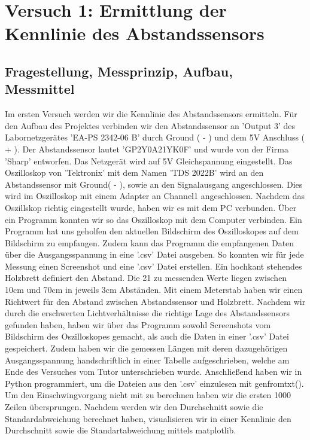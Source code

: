 \documentclass[12pt, oneside, a4paper, \docLanguage]{report}
\begin{document}
%
%
\chapter{Versuch 1: Ermittlung der Kennlinie des Abstandssensors}
\label{chap:VERSUCH_1}

\section{Fragestellung, Messprinzip, Aufbau, Messmittel}
\label{chap:VERSUCH_1_FRAGESTELLUNG}
Im ersten Versuch werden wir die Kennlinie des Abstandssensors ermitteln.  Für den Aufbau des Projektes verbinden wir den Abstandssensor an 'Output 3' des Labornetzgerätes 'EA-PS 2342-06 B' durch Ground ( - ) und dem 5V Anschluss ( + ).
Der Abstandssensor lautet 'GP2Y0A21YK0F' und wurde von der Firma 'Sharp' entworfen. Das Netzgerät wird auf 5V Gleichspannung eingestellt. Das Oszilloskop von 'Tektronix' mit dem Namen 'TDS 2022B' wird an den Abstandssensor mit Ground( - ), sowie an den Signalausgang angeschlossen.
Dies wird im Oszilloskop mit einem Adapter an Channel1 angeschlossen. Nachdem das Oszillskop richtig eingestellt wurde, haben wir es mit dem PC verbunden.
Über ein Programm konnten wir so das Oszilloskop mit dem Computer verbinden. Ein Programm hat uns geholfen den aktuellen Bildschirm des Oszilloskopes auf dem Bildschirm zu empfangen.
Zudem kann das Programm die empfangenen Daten über die Ausgangsspannung in eine '.csv' Datei ausgeben.
So konnten wir für jede Messung einen Screenshot und eine '.csv' Datei erstellen. 
Ein hochkant stehendes Holzbrett definiert den Abstand. Die 21 zu messenden Werte liegen zwischen 10cm und 70cm in jeweils  3cm Abständen. Mit einem Meterstab haben wir einen Richtwert für den Abstand zwischen Abstandssensor und Holzbrett. 
Nachdem wir durch die erschwerten Lichtverhältnisse die richtige Lage des Abstandssensors gefunden haben, haben wir über das Programm sowohl Screenshots vom Bildschirm des Oszilloskopes gemacht, als auch die Daten in einer '.csv' Datei gespeichert.
Zudem haben wir die gemessen Längen mit deren dazugehörigen Ausgangsspannung handschriftlich in einer Tabelle aufgeschrieben, welche am Ende des Versuches vom Tutor unterschrieben wurde.
Anschließend haben wir in Python programmiert, um die Dateien aus den '.csv' einzulesen mit genfromtxt(). Um den Einschwingvorgang nicht mit zu berechnen haben wir die ersten 1000 Zeilen übersprungen. 
Nachdem werden wir den Durchschnitt sowie die Standardabweichung berechnet haben, visualisieren wir in einer Kennlinie den Durchschnitt sowie die Standartabweichung mittels matplotlib.
\end{document}

